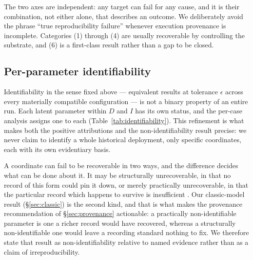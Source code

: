 The two axes are independent: any target can fail for any cause, and it is their combination, not either alone, that describes an outcome. We deliberately avoid the phrase ``true reproducibility failure'' whenever execution provenance is incomplete. Categories (1) through (4) are usually recoverable by controlling the substrate, and (6) is a first-class result rather than a gap to be closed.

\subsection{Per-parameter identifiability}
\label{sec:identifiability}

Identifiability in the sense fixed above --- equivalent results at tolerance $\epsilon$ across every materially compatible configuration --- is not a binary property of an entire run. Each latent parameter within $D$ and $I$ has its own status, and the per-case analysis assigns one to each (Table~\ref{tab:identifiability}). This refinement is what makes both the positive attributions and the non-identifiability result precise: we never claim to identify a whole historical deployment, only specific coordinates, each with its own evidentiary basis.

A coordinate can fail to be recoverable in two ways, and the difference decides what can be done about it. It may be structurally unrecoverable, in that no record of this form could pin it down, or merely practically unrecoverable, in that the particular record which happens to survive is insufficient \citep{raue2009identifiability}. Our classic-model result (\S\ref{sec:classic}) is the second kind, and that is what makes the provenance recommendation of \S\ref{sec:provenance} actionable: a practically non-identifiable parameter is one a richer record would have recovered, whereas a structurally non-identifiable one would leave a recording standard nothing to fix. We therefore state that result as non-identifiability relative to named evidence rather than as a claim of irreproducibility.

